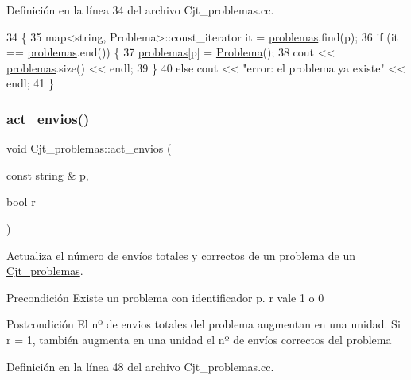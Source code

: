 Definición en la línea 34 del archivo Cjt\+\_\+problemas.\+cc.


\begin{DoxyCode}
34                                                       \{
35       map<string, Problema>::const\_iterator it = \mbox{\hyperlink{class_cjt__problemas_aad49222fb63517d7d7fc3d691f045cc5}{problemas}}.find(p);
36       \textcolor{keywordflow}{if} (it == \mbox{\hyperlink{class_cjt__problemas_aad49222fb63517d7d7fc3d691f045cc5}{problemas}}.end()) \{
37         \mbox{\hyperlink{class_cjt__problemas_aad49222fb63517d7d7fc3d691f045cc5}{problemas}}[p] = \mbox{\hyperlink{class_problema}{Problema}}();
38         cout << \mbox{\hyperlink{class_cjt__problemas_aad49222fb63517d7d7fc3d691f045cc5}{problemas}}.size() << endl;
39       \}
40       \textcolor{keywordflow}{else} cout << \textcolor{stringliteral}{"error: el problema ya existe"} << endl;
41     \}
\end{DoxyCode}
\mbox{\label{class_cjt__problemas_abb0defe688a1012b27eddc463b53bf18}} 
\subsubsection{\texorpdfstring{act\+\_\+envios()}{act\_envios()}}
{\footnotesize\ttfamily void Cjt\+\_\+problemas\+::act\+\_\+envios (\begin{DoxyParamCaption}\item[{const string \&}]{p,  }\item[{bool}]{r }\end{DoxyParamCaption})}



Actualiza el número de envíos totales y correctos de un problema de un \mbox{\hyperlink{class_cjt__problemas}{Cjt\+\_\+problemas}}. 

\begin{DoxyPrecond}{Precondición}
Existe un problema con identificador p. r vale 1 o 0 
\end{DoxyPrecond}
\begin{DoxyPostcond}{Postcondición}
El nº de envios totales del problema augmentan en una unidad. Si r = 1, también augmenta en una unidad el nº de envíos correctos del problema 
\end{DoxyPostcond}


Definición en la línea 48 del archivo Cjt\+\_\+problemas.\+cc.


